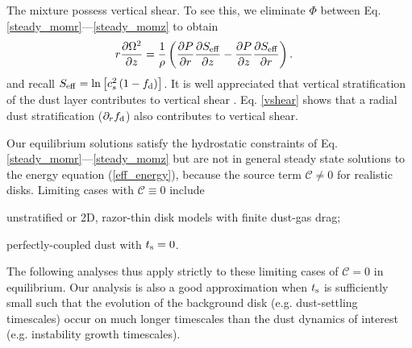 The mixture possess vertical shear. To see this, we eliminate $\Phi$
between Eq. \ref{steady_momr}---\ref{steady_momz} to 
obtain 
\begin{align}\label{vshear}
  r\frac{\p \Omega^2}{\p z} 
   &= \frac{1}{\rho}\left(\frac{\p P}{\p r}\frac{\p \seff}{\p z} -\frac{\p
    P}{\p z}\frac{\p \seff}{\p r} \right).%
\end{align}
and recall $S_\mathrm{eff} = \ln{\left[c_s^2\left(1-f_\mathrm{d}\right)\right]}$. It is well appreciated that 
vertical stratification of the dust layer contributes to vertical shear
\citep{chiang08}. Eq. \ref{vshear} shows that a radial dust
stratification ($\partial_rf_\mathrm{d}$) also contributes to vertical shear.  



Our equilibrium solutions satisfy the hydrostatic constraints of
Eq. \ref{steady_momr}---\ref{steady_momz} but are not in general
steady state solutions to the energy 
equation (\ref{eff_energy}), because the source term $\mathcal{C} \ne0$ for realistic disks.  
Limiting cases with $\mathcal{C} \equiv 0$ include \begin{inparaenum}[1)] 
\item 
  unstratified or 2D, razor-thin disk models with finite dust-gas drag; %
\item 
  perfectly-coupled dust with $t_\mathrm{s}=0$. %
\end{inparaenum} 
The following analyses thus apply strictly to these limiting cases of
$\mathcal{C} = 0$ in equilibrium.  Our analysis is also a good approximation when 
$t_\mathrm{s}$ is sufficiently small such that the evolution of the background disk (e.g. dust-settling timescales) 
occur on much longer timescales than the dust dynamics of interest (e.g. instability growth timescales).   








